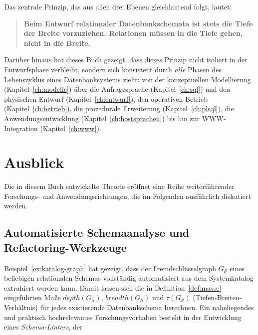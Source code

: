 ﻿\documentclass[a4paper,12pt]{report}
\theoremstyle{definition}
\theoremstyle{remark}
\newcommand{\depth}{\mathit{depth}}
\newcommand{\breadth}{\mathit{breadth}}
\begin{document}
Das zentrale Prinzip, das aus allen drei Ebenen gleichlautend folgt,
lautet:

\begin{quote}
\large\bfseries
Beim Entwurf relationaler Datenbankschemata ist stets die Tiefe der
Breite vorzuziehen. Relationen müssen in die Tiefe gehen, nicht in die
Breite.
\end{quote}

Darüber hinaus hat dieses Buch gezeigt, dass dieses Prinzip nicht isoliert
in der Entwurfsphase verbleibt, sondern sich konsistent durch
\emph{alle} Phasen des Lebenszyklus eines Datenbanksystems zieht: von
der konzeptuellen Modellierung (Kapitel~\ref{ch:modelle}) über die
Anfragesprache (Kapitel~\ref{ch:sql}) und den physischen Entwurf
(Kapitel~\ref{ch:entwurf}), den operativen Betrieb
(Kapitel~\ref{ch:betrieb}), die prozedurale Erweiterung
(Kapitel~\ref{ch:plsql}), die Anwendungsentwicklung
(Kapitel~\ref{ch:hostsprachen}) bis hin zur WWW-Integration
(Kapitel~\ref{ch:www}).

\section{Ausblick}
\label{sec:ausblick}

Die in diesem Buch entwickelte Theorie eröffnet eine Reihe
weiterführender Forschungs- und Anwendungsrichtungen, die im Folgenden
ausführlich diskutiert werden.

\subsection{Automatisierte Schemaanalyse und Refactoring-Werkzeuge}
\label{sec:ausblick-tooling}

Beispiel~\ref{ex:katalog-graph} hat gezeigt, dass der
Fremdschlüsselgraph $G_{\mathcal{S}}$ eines beliebigen relationalen
Schemas vollständig automatisiert aus dem Systemkatalog extrahiert
werden kann. Damit lassen sich die in
Definition~\ref{def:masse} eingeführten Maße $\depth(G_{\mathcal{S}})$,
$\breadth(G_{\mathcal{S}})$ und $\tau(G_{\mathcal{S}})$
(Tiefen-Breiten-Verhältnis) für jedes existierende Datenbankschema
berechnen. Ein naheliegendes und praktisch hochrelevantes
Forschungsvorhaben besteht in der Entwicklung eines
\emph{Schema-Linters}, der
\end{document}

